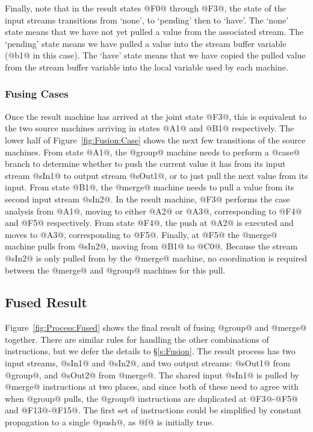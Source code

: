 Finally, note that in the result states @F0@ through @F3@, the state of the input streams transitions from `none', to `pending' then to `have'. The `none' state means that we have not yet pulled a value from the associated stream. The `pending' state means we have pulled a value into the stream buffer variable (@b1@ in this case). The `have' state means that we have copied the pulled value from the stream buffer variable into the local variable used by each machine. 



\subsubsection{Fusing Cases}
Once the result machine has arrived at the joint state @F3@, this is equivalent to the two source machines arriving in states @A1@ and @B1@ respectively. The lower half of Figure~\ref{fig:Fusion:Case} shows the next few transitions of the source machines. From state @A1@, the @group@ machine needs to perform a @case@ branch to determine whether to push the current value it has from its input stream @sIn1@ to output stream @sOut1@, or to just pull the next value from its input. From state @B1@, the @merge@ machine needs to pull a value from its second input stream @sIn2@. In the result machine, @F3@ performs the case analysis from @A1@, moving to either @A2@ or @A3@, corresponding to @F4@ and @F5@ respectively. From state @F4@, the push at @A2@ is executed and moves to @A3@, corresponding to @F5@. Finally, at @F5@ the @merge@ machine pulls from @sIn2@, moving from @B1@ to @C0@. Because the stream @sIn2@ is only pulled from by the @merge@ machine, no coordination is required between the @merge@ and @group@ machines for this pull.


\subsection{Fused Result}

Figure~\ref{fig:Process:Fused} shows the final result of fusing @group@ and @merge@ together. There are similar rules for handling the other combinations of instructions, but we defer the details to \S\ref{s:Fusion}.
The result process has two input streams, @sIn1@ and @sIn2@, and two output streams: @sOut1@ from @group@, and @sOut2@ from @merge@. 
The shared input @sIn1@ is pulled by @merge@ instructions at two places, and since both of these need to agree with when @group@ pulls, the @group@ instructions are duplicated at @F3@-@F5@ and @F13@-@F15@. The first set of instructions could be simplified by constant propagation to a single @push@, as @f@ is initially true.

